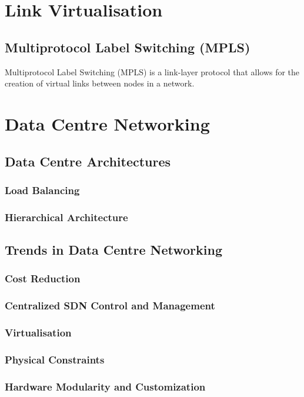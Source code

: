 \documentclass[12pt letter]{report}
\begin{document}
\chapter{Link Virtualisation}

\section{Multiprotocol Label Switching (MPLS)}

Multiprotocol Label Switching (MPLS) is a link-layer protocol that
allows for the creation of virtual links between nodes in a network.

\chapter{Data Centre Networking}

\section{Data Centre Architectures}

\subsection{Load Balancing}

\subsection{Hierarchical Architecture}

\section{Trends in Data Centre Networking}

\subsection{Cost Reduction}

\subsection{Centralized SDN Control and Management}

\subsection{Virtualisation}

\subsection{Physical Constraints}

\subsection{Hardware Modularity and Customization}
\end{document}
